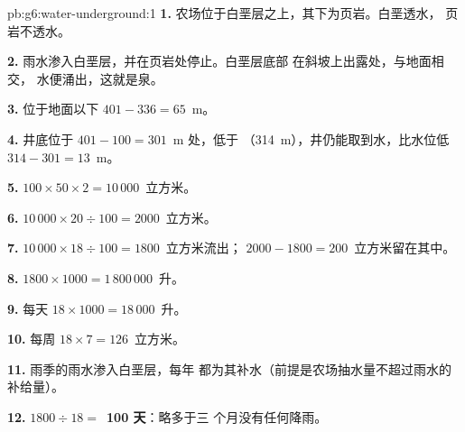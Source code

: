 \begin{solution}{pb:g6:water-underground:1}
\textbf{1.} 农场位于白垩层之上，其下为页岩。白垩透水，
页岩不透水。

\textbf{2.} 雨水渗入白垩层，并在页岩处停止。白垩层底部
在斜坡上出露处，与地面相交，
水便涌出，这就是泉。

\textbf{3.} 位于地面以下 $401 - 336 = 65$~m。

\textbf{4.} 井底位于 $401 - 100 = 301$~m 处，低于
（314~m），井仍能取到水，比水位低 $314 - 301 =
13$~m。

\textbf{5.} $100 \times 50 \times 2 = 10\,000$~立方米。

\textbf{6.} $10\,000 \times 20 \div 100 = 2000$~立方米。

\textbf{7.} $10\,000 \times 18 \div 100 = 1800$~立方米流出；
$2000 - 1800 = 200$~立方米留在其中。

\textbf{8.} $1800 \times 1000 = 1\,800\,000$~升。

\textbf{9.} 每天 $18 \times 1000 = 18\,000$~升。

\textbf{10.} 每周 $18 \times 7 = 126$~立方米。

\textbf{11.} 雨季的雨水渗入白垩层，每年
都为其补水（前提是农场抽水量不超过雨水的补给量）。

\textbf{12.} $1800 \div 18 = $~\textbf{100 天}：略多于三
个月没有任何降雨。
\end{solution}
